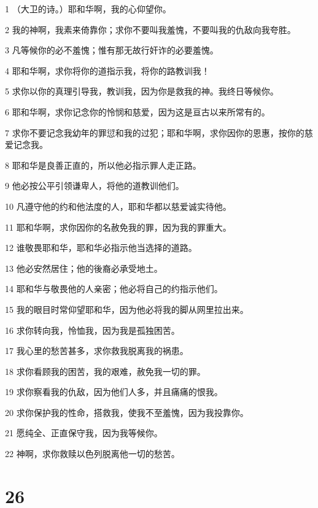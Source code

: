 \par 1 （大卫的诗。）耶和华啊，我的心仰望你。
\par 2 我的神啊，我素来倚靠你；求你不要叫我羞愧，不要叫我的仇敌向我夸胜。
\par 3 凡等候你的必不羞愧；惟有那无故行奸诈的必要羞愧。
\par 4 耶和华啊，求你将你的道指示我，将你的路教训我！
\par 5 求你以你的真理引导我，教训我，因为你是救我的神。我终日等候你。
\par 6 耶和华啊，求你记念你的怜悯和慈爱，因为这是亘古以来所常有的。
\par 7 求你不要记念我幼年的罪愆和我的过犯；耶和华啊，求你因你的恩惠，按你的慈爱记念我。
\par 8 耶和华是良善正直的，所以他必指示罪人走正路。
\par 9 他必按公平引领谦卑人，将他的道教训他们。
\par 10 凡遵守他的约和他法度的人，耶和华都以慈爱诚实待他。
\par 11 耶和华啊，求你因你的名赦免我的罪，因为我的罪重大。
\par 12 谁敬畏耶和华，耶和华必指示他当选择的道路。
\par 13 他必安然居住；他的後裔必承受地土。
\par 14 耶和华与敬畏他的人亲密；他必将自己的约指示他们。
\par 15 我的眼目时常仰望耶和华，因为他必将我的脚从网里拉出来。
\par 16 求你转向我，怜恤我，因为我是孤独困苦。
\par 17 我心里的愁苦甚多，求你救我脱离我的祸患。
\par 18 求你看顾我的困苦，我的艰难，赦免我一切的罪。
\par 19 求你察看我的仇敌，因为他们人多，并且痛痛的恨我。
\par 20 求你保护我的性命，搭救我，使我不至羞愧，因为我投靠你。
\par 21 愿纯全、正直保守我，因为我等候你。
\par 22 神啊，求你救赎以色列脱离他一切的愁苦。

\chapter{26}

